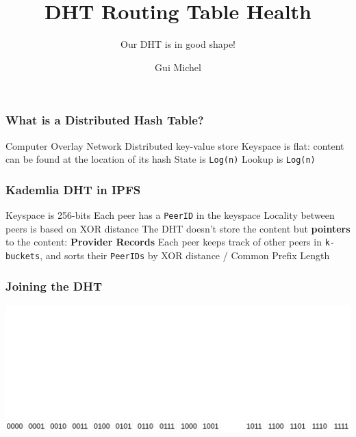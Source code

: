 \documentclass{pl-slide}
\title{DHT Routing Table Health}
\subtitle{Our DHT is in good shape!}
\author{Gui Michel}
\institute{Protocol Labs}
\date{\DTMdate{2022-10-28}}
\begin{document}
\frame{\titlepage}


\begin{frame}
\frametitle{What is a Distributed Hash Table?}
\begin{itemize}
	\itemc Computer Overlay Network
	\itemc Distributed key-value store
	\itemc Keyspace is flat: content can be found at the location of its hash
	\itemc State is \texttt{Log(n)}
	\itemc Lookup is \texttt{Log(n)}
\end{itemize}
\end{frame}

\begin{frame}
\frametitle{Kademlia DHT in IPFS}
\begin{itemize}
	\itemc Keyspace is 256-bits
	\itemc Each peer has a \texttt{PeerID} in the keyspace
	\itemc Locality between peers is based on XOR distance
	\itemc The DHT doesn't store the content but \textbf{pointers} to the content: \textbf{Provider Records}
	\itemc Each peer keeps track of other peers in \texttt{k-buckets}, and sorts their \texttt{PeerIDs} by XOR distance / Common Prefix Length

\end{itemize}
\end{frame}

\begin{frame}
\frametitle{Joining the DHT}
\begin{minipage}[b]{\linewidth}
\begin{center}
        \includegraphics[width=\linewidth,keepaspectratio]{resources/dht-insert0.png}
\end{center}
\end{minipage}
\end{frame}
\end{document}
